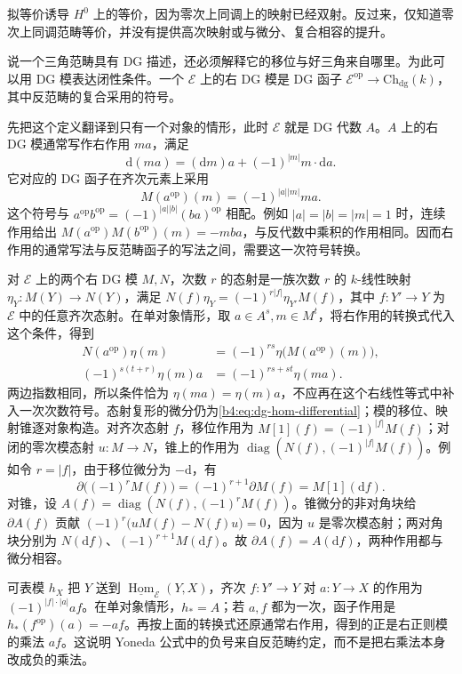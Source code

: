 拟等价诱导 \(H^0\) 上的等价，因为零次上同调上的映射已经双射。反过来，仅知道零次上同调范畴等价，并没有提供高次映射或与微分、复合相容的提升。

\ProseParagraphBreak
说一个三角范畴具有 DG 描述，还必须解释它的移位与好三角来自哪里。为此可以用 DG 模表达闭性条件。一个 \(\mathcal E\) 上的右 DG 模是 DG 函子 \(\mathcal E^{\mathrm{op}}\to\mathrm{Ch}_{\mathrm{dg}}(k)\)，其中反范畴的复合采用的符号。

\ProseParagraphBreak
先把这个定义翻译到只有一个对象的情形，此时 \(\mathcal E\) 就是 DG 代数 \(A\)。\(A\) 上的右 DG 模通常写作右作用 \(ma\)，满足
\[
	\mathrm d(ma)=(\mathrm dm)a+(-1)^{|m|}m\cdot\mathrm da.
\]
它对应的 DG 函子在齐次元素上采用
\[
	M(a^{\mathrm{op}})(m)=(-1)^{|a||m|}ma.
\]
这个符号与 \(a^{\mathrm{op}}b^{\mathrm{op}}=(-1)^{|a||b|}(ba)^{\mathrm{op}}\) 相配。例如 \(|a|=|b|=|m|=1\) 时，连续作用给出 \(M(a^{\mathrm{op}})M(b^{\mathrm{op}})(m)=-mba\)，与反代数中乘积的作用相同。因而右作用的通常写法与反范畴函子的写法之间，需要这一次符号转换。

\ProseParagraphBreak
对 \(\mathcal E\) 上的两个右 DG 模 \(M,N\)，次数 \(r\) 的态射是一族次数 \(r\) 的 \(k\)-线性映射 \(\eta_Y:M(Y)\to N(Y)\)，满足 \(N(f)\eta_Y=(-1)^{r|f|}\eta_{Y'}M(f)\)，其中 \(f:Y'\to Y\) 为 \(\mathcal E\) 中的任意齐次态射。在单对象情形，取 \(a\in A^s,m\in M^t\)，将右作用的转换式代入这个条件，得到
\[
	\begin{aligned}
		N(a^{\mathrm{op}})\eta(m) &=(-1)^{rs}\eta\bigl(M(a^{\mathrm{op}})(m)\bigr),\\
		(-1)^{s(t+r)}\eta(m)a &=(-1)^{rs+st}\eta(ma).
	\end{aligned}
\]
两边指数相同，所以条件恰为 \(\eta(ma)=\eta(m)a\)，不应再在这个右线性等式中补入一次次数符号。态射复形的微分仍为\eqref{b4:eq:dg-hom-differential}；模的移位、映射锥逐对象构造。对齐次态射 \(f\)，移位作用为 \(M[1](f)=(-1)^{|f|}M(f)\)；对闭的零次模态射 \(u:M\to N\)，锥上的作用为 \(\operatorname{diag}(N(f),(-1)^{|f|}M(f))\)。例如令 \(r=|f|\)，由于移位微分为 \(-\mathrm d\)，有
\[
	\partial\bigl((-1)^rM(f)\bigr)=(-1)^{r+1}\partial M(f) =M[1](\mathrm df).
\]
对锥，设 \(A(f)=\operatorname{diag}(N(f),(-1)^rM(f))\)。锥微分的非对角块给 \(\partial A(f)\) 贡献 \((-1)^r\bigl(uM(f)-N(f)u\bigr)=0\)，因为 \(u\) 是零次模态射；两对角块分别为 \(N(\mathrm df)\)、\((-1)^{r+1}M(\mathrm df)\)。故 \(\partial A(f)=A(\mathrm df)\)，两种作用都与微分相容。

\ProseParagraphBreak
可表模 \(h_X\) 把 \(Y\) 送到 \(\underline{\operatorname{Hom}}_{\mathcal E}(Y,X)\)，齐次 \(f:Y'\to Y\) 对 \(a:Y\to X\) 的作用为 \((-1)^{|f|\cdot|a|}af\)。在单对象情形，\(h_*=A\)；若 \(a,f\) 都为一次，函子作用是 \(h_*(f^{\mathrm{op}})(a)=-af\)。再按上面的转换式还原通常右作用，得到的正是右正则模的乘法 \(af\)。这说明 Yoneda 公式中的负号来自反范畴约定，而不是把右乘法本身改成负的乘法。

